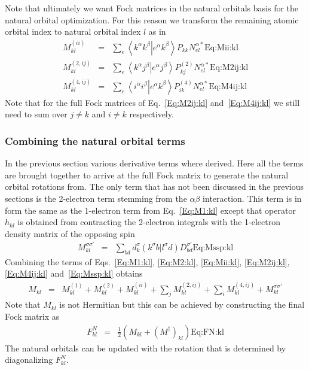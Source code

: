 \documentclass[pra,nofootinbib]{revtex4-1}
\newcommand{\eria}[4]{\left\langle #1^\alpha #2^\beta \right.\left| #3^\alpha #4^\beta \right\rangle}
\newcommand{\dlabel}[1]{\text{#1}\label{#1}}
\begin{document}
Note that ultimately we want Fock matrices in the natural orbitals basis
for the natural orbital optimization. For this reason we transform the remaining
atomic orbital index to natural orbital index $l$ as in
\begin{eqnarray}
   M^{(ii)}_{kl}
   &=& \sum_e\eria{k}{k}{e}{k}P_{kk}N^{\alpha*}_{el}
       \dlabel{Eq:Mii:kl} \\
   M^{(2,ij)}_{kl}
   &=& \sum_e\eria{k}{j}{e}{j}P^{(2)}_{kj}N^{\alpha*}_{el}
       \dlabel{Eq:M2ij:kl} \\
   M^{(4,ij)}_{kl}
   &=& \sum_e\eria{i}{i}{e}{k}P^{(4)}_{ik}N^{\alpha*}_{el}
       \dlabel{Eq:M4ij:kl} 
\end{eqnarray}
Note that for the full Fock matrices of Eq.~\ref{Eq:M2ij:kl} and~\ref{Eq:M4ij:kl}
we still need to sum over $j \ne k$ and $i \ne k$ respectively.

\subsubsection{Combining the natural orbital terms}

In the previous section various derivative terms where derived. Here all the
terms are brought together to arrive at the full Fock matrix to generate the
natural orbital rotations from. The only term that has not been discussed in the
previous sections is the 2-electron term stemming from the $\alpha\beta$ 
interaction. This term is in form the same as the 1-electron term from
Eq.~\ref{Eq:M1:kl} except that operator $h_{kl}$ is obtained from contracting
the 2-electron integrals with the 1-electron density matrix of the opposing 
spin
\begin{eqnarray}
   M^{\sigma\sigma'}_{kl}
   &=& \sum_{bd}d^{\sigma}_k(k^{\sigma}b|l^{\sigma}d)D^{\sigma'}_{bd}
       \dlabel{Eq:Mssp:kl}
\end{eqnarray}
Combining the terms of Eqs.~\ref{Eq:M1:kl}, \ref{Eq:M2:kl}, \ref{Eq:Mii:kl},
\ref{Eq:M2ij:kl}, \ref{Eq:M4ij:kl} and~\ref{Eq:Mssp:kl} obtains
\begin{eqnarray}
  M_{kl} 
  &=& M^{(1)}_{kl} + M^{(2)}_{kl} + M^{(ii)}_{kl} +
      \sum_j M^{(2,ij)}_{kl} + \sum_i M^{(4,ij)}_{kl} + M^{\sigma\sigma'}_{kl}
\end{eqnarray}
Note that $M_{kl}$ is not Hermitian but this can be achieved by constructing
the final Fock matrix as
\begin{eqnarray}
  F^{N}_{kl} &=& \frac{1}{2}\left(M_{kl}+(M^\dagger)_{kl}\right)
                 \dlabel{Eq:FN:kl}
\end{eqnarray}
The natural orbitals can be updated with the rotation that is determined
by diagonalizing $F^{N}_{kl}$.
\end{document}
